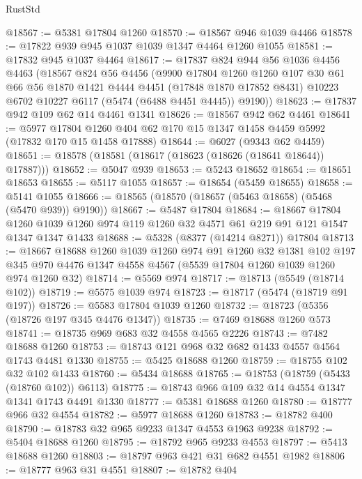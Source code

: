 \begin{lexlean}{RustStd}
\begin{coremodule}
@18567 := @5381 @17804 @1260
@18570 := @18567 @946 @1039 @4466
@18578 := @17822 @939 @945 @1037 @1039 @1347 @4464 @1260 @1055
@18581 := @17832 @945 @1037 @4464
@18617 := @17837
    @824
    @944
    @56
    @1036
    @4456
    @4463
    (@18567
      @824
      @56
      @4456
      (@9900
        @17804
        @1260
        @1260
        @107
        @30
        @61
        @66
        @56
        @1870
        @1421
        @4444
        @4451
        (@17848 @1870 @17852 @8431)
        @10223
        @6702
        @10227
        @6117
        (@5474 (@6488 @4451 @4445))
        @9190))
@18623 := @17837 @942 @109 @62 @14 @4461 @1341
@18626 := @18567 @942 @62 @4461
@18641 := @5977
    @17804
    @1260
    @404
    @62
    @170
    @15
    @1347
    @1458
    @4459
    @5992
    (@17832 @170 @15 @1458 @17888)
@18644 := @6027 (@9343 @62 @4459)
@18651 := @18578 (@18581 (@18617 (@18623 (@18626 (@18641 @18644)) @17887)))
@18652 := @5047 @939
@18653 := @5243 @18652
@18654 := @18651 @18653
@18655 := @5117 @1055
@18657 := @18654 (@5459 @18655)
@18658 := @5141 @1055
@18666 := @18565 (@18570 (@18657 (@5463 @18658) (@5468 (@5470 @939)) @9190))
@18667 := @5487 @17804
@18684 := @18667
    @17804
    @1260
    @1039
    @1260
    @974
    @119
    @1260
    @32
    @4571
    @61
    @219
    @91
    @121
    @1547
    @1347
    @1347
    @1433
@18688 := @5328 (@8377 (@14214 @8271)) @17804
@18713 := @18667
    @18688
    @1260
    @1039
    @1260
    @974
    @91
    @1260
    @32
    @1381
    @102
    @197
    @345
    @970
    @4476
    @1347
    @4558
    @4567
    (@5539 @17804 @1260 @1039 @1260 @974 @1260 @32)
@18714 := @5569 @974
@18717 := @18713 (@5549 (@18714 @102))
@18719 := @5575 @1039 @974
@18723 := @18717 (@5474 (@18719 @91 @197))
@18726 := @5583 @17804 @1039 @1260
@18732 := @18723 (@5356 (@18726 @197 @345 @4476 @1347))
@18735 := @7469 @18688 @1260 @573
@18741 := @18735 @969 @683 @32 @4558 @4565 @2226
@18743 := @7482 @18688 @1260
@18753 := @18743 @121 @968 @32 @682 @1433 @4557 @4564 @1743 @4481 @1330
@18755 := @5425 @18688 @1260
@18759 := @18755 @102 @32 @102 @1433
@18760 := @5434 @18688
@18765 := @18753 (@18759 (@5433 (@18760 @102)) @6113)
@18775 := @18743 @966 @109 @32 @14 @4554 @1347 @1341 @1743 @4491 @1330
@18777 := @5381 @18688 @1260
@18780 := @18777 @966 @32 @4554
@18782 := @5977 @18688 @1260
@18783 := @18782 @400
@18790 := @18783 @32 @965 @9233 @1347 @4553 @1963 @9238
@18792 := @5404 @18688 @1260
@18795 := @18792 @965 @9233 @4553
@18797 := @5413 @18688 @1260
@18803 := @18797 @963 @421 @31 @682 @4551 @1982
@18806 := @18777 @963 @31 @4551
@18807 := @18782 @404

\end{coremodule}
\end{lexlean}

